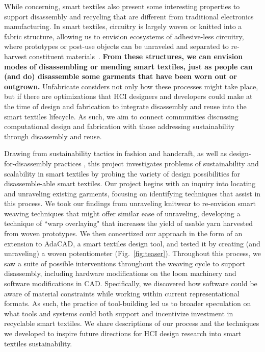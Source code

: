 While concerning, smart textiles also present some interesting properties to support disassembly and recycling that are different from traditional electronics manufacturing. In smart textiles, circuitry is largely woven or knitted into a fabric structure, allowing us to envision ecosystems of adhesive-less circuitry, where prototypes or post-use objects can be unraveled and separated to re-harvest constituent materials~\cite{zysset_weaving_2010}. \textbf{From these structures, we can envision modes of disassembling or mending smart textiles, just as people can (and do) disassemble some garments that have been worn out or outgrown.} Unfabricate considers not only how these processes might take place, but if there are optimizations that HCI designers and developers could make at the time of design and fabrication to integrate disassembly and reuse into the smart textiles lifecycle. As such, we aim to connect communities discussing computational design and fabrication with those addressing sustainability through disassembly and reuse.

Drawing from sustainability tactics in fashion and handcraft, as well as design-for-disassembly practices \cite{webster_dfd,circular_disassembly}, this project investigates problems of sustainability and scalability in smart textiles by probing the variety of design possibilities for disassemble-able smart textiles. Our project begins with an inquiry into locating and unraveling existing garments, focusing on identifying techniques that assist in this process. We took our findings from unraveling knitwear to re-envision smart weaving techniques that might offer similar ease of unraveling, developing a technique of ``warp overlaying" that increases the yield of usable yarn harvested from woven prototypes. We then concertized our approach in the form of an extension to AdaCAD, a smart textiles design tool, and tested it by creating (and unraveling) a woven potentiometer (Fig.~\ref{fig:teaser}). Throughout this process, we saw a suite of possible interventions throughout the weaving cycle to support disassembly, including hardware modifications on the loom machinery and software modifications in CAD. Specifically, we discovered how software could be aware of material constraints while working within current representational formats. As such, the practice of tool-building led us to broader speculation on what tools and systems could both support and incentivize investment in recyclable smart textiles. We share descriptions of our process and the techniques we developed to inspire future directions for HCI design research into smart textiles sustainability.
 
